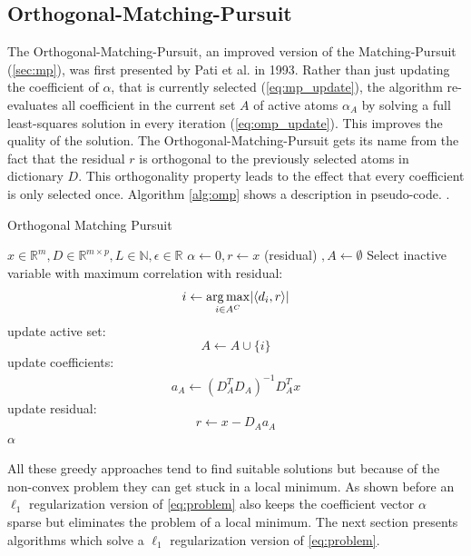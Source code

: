 \subsection{Orthogonal-Matching-Pursuit}
\label{sec:omp}
The Orthogonal-Matching-Pursuit, an improved version of
the Matching-Pursuit (\ref{sec:mp}), was first presented by Pati et al.
in 1993\cite{Pati1993}. Rather than just updating the coefficient of
$\alpha$, that is currently selected (\ref{eq:mp_update}), the algorithm
re-evaluates
all coefficient in the current set $A$ of active atoms 
$\alpha_A$ by solving a full least-squares solution in every iteration
(\ref{eq:omp_update}). This improves the quality of the
solution\cite{Pati1993}. The Orthogonal-Matching-Pursuit gets its name from
the fact that the residual $r$ is orthogonal to the previously selected atoms
in dictionary $D$. This orthogonality property leads to the effect that every
coefficient is only selected once. Algorithm \ref{alg:omp} shows a description
in pseudo-code.
.
\begin{algorithm}[H]
\caption{Orthogonal Matching Pursuit}
\label{alg:omp}
\begin{algorithmic}[1]
\REQUIRE $x \in \mathbb{R}^m, D \in \mathbb{R}^{m\times p}, L \in \mathbb{N},
\epsilon \in \mathbb{R}$
\STATE $\alpha \gets 0, r \gets x $ (residual) $, A \gets \emptyset$
\STATE Select inactive variable with maximum correlation with residual: 
\begin{equation*}
i \gets \operatorname*{arg\,max}_{i \in A^C} \lvert \left<d_i,r\right> \rvert
\end{equation*}
\STATE update active set:
\begin{equation*}
 A \gets A \cup \{i\} 
\end{equation*}
\STATE update coefficients: 
\begin{align}
a_A \gets \left( D_A^T D_A \right)^{-1} D_A^T x  \label{eq:omp_update}
\end{align}\label{alg:OMP_DTD}
\STATE update residual:
\begin{equation*}
 r \gets x-D_Aa_A
\end{equation*}
\ENDFOR
\RETURN $\alpha$
\end{algorithmic}
\end{algorithm}

All these greedy approaches tend to find suitable solutions but
because of the non-convex problem they can get stuck in a local minimum. As
shown before an $\ell_1$ regularization version of \ref{eq:problem} also keeps
the coefficient vector $\alpha$ sparse but eliminates the problem of a local
minimum. The next section presents algorithms which solve  a $\ell_1$
regularization version of \ref{eq:problem}.


